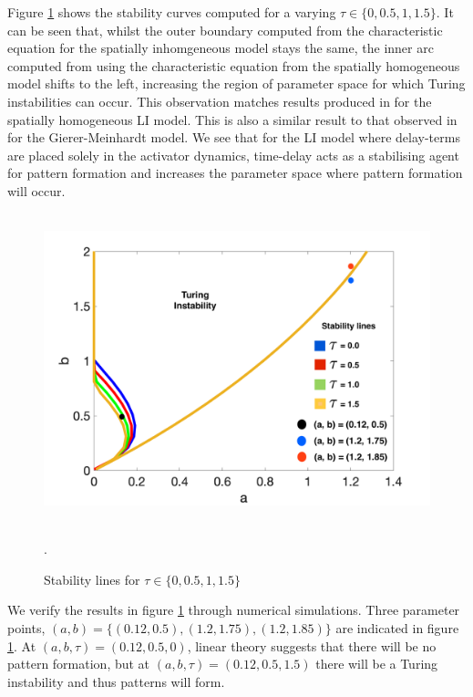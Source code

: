Figure \ref{fig:tspacetau} shows the stability curves computed for a varying $\tau\in\{0,0.5,1,1.5\}$. It can be seen that, whilst the outer boundary computed from the characteristic equation for the spatially inhomgeneous model stays the same, the inner arc computed from using the characteristic equation from the spatially homogeneous model shifts to the left, increasing the region of parameter space for which Turing instabilities can occur. This observation matches results produced in \cite{william} for the spatially homogeneous LI model. This is also a similar result to that observed in \cite{fadai} for the Gierer-Meinhardt model. We see that for the LI model where delay-terms are placed solely in the activator dynamics, time-delay acts as a stabilising agent for pattern formation and increases the parameter space where pattern formation will occur.
\begin{figure}[H]
        \centering
        \includegraphics[width=12cm,height = 9cm]{tspacetau.png}
        \caption{Stability lines for $\tau\in\{0,0.5,1,1.5\}$}.
        \label{fig:tspacetau}
\end{figure}
We verify the results in figure \ref{fig:tspacetau} through numerical simulations. Three parameter points, $(a,b)=\{(0.12,0.5),(1.2,1.75),(1.2,1.85)\}$ are indicated in figure \ref{fig:tspacetau}. At $(a,b,\tau)=(0.12,0.5,0)$, linear theory suggests that there will be no pattern formation, but at $(a,b,\tau)=(0.12,0.5,1.5)$ there will be a Turing instability and thus patterns will form.
